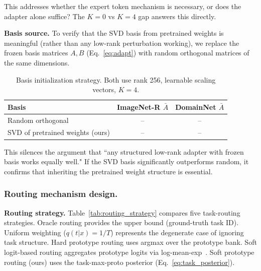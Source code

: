 This addresses whether the expert token mechanism is necessary, or does the adapter alone suffice? The $K=0$ vs $K=4$ gap answers this directly.

\textbf{Basis source.} To verify that the SVD basis from pretrained weights is meaningful (rather than any low-rank perturbation working), we replace the frozen basis matrices $A, B$ (Eq.~\ref{eq:adapt}) with random orthogonal matrices of the same dimensions.

\begin{table}[h]
\centering
\caption{Basis initialization strategy. Both use rank 256, learnable scaling vectors, $K=4$.}
\label{tab:basis_source}
\small
\begin{tabular}{lcc}
\toprule
Basis & ImageNet-R $\bar{A}$ & DomainNet $\bar{A}$ \\
\midrule
Random orthogonal & -- & -- \\
SVD of pretrained weights (ours) & -- & -- \\
\bottomrule
\end{tabular}
\end{table}

This silences the argument that ``any structured low-rank adapter with frozen basis works equally well." If the SVD basis significantly outperforms random, it confirms that inheriting the pretrained weight structure is essential.

\subsubsection{Routing mechanism design.}

\textbf{Routing strategy.}
Table~\ref{tab:routing_strategy} compares five task-routing strategies. Oracle routing provides the upper bound (ground-truth task ID). Uniform weighting ($q(t|x)=1/T$) represents the degenerate case of ignoring task structure. Hard prototype routing uses argmax over the prototype bank. Soft logit-based routing aggregates prototype logits via log-mean-exp~\cite{wang2025integrating}. Soft prototype routing (ours) uses the task-max-proto posterior (Eq.~\ref{eq:task_posterior}).

